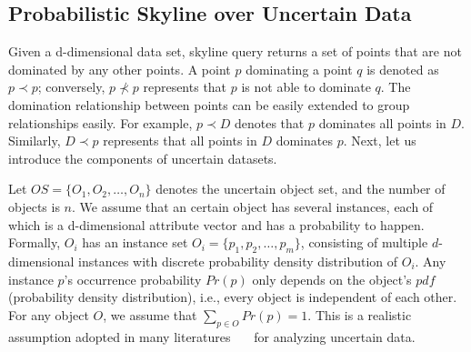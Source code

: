 \subsection{Probabilistic Skyline over Uncertain Data}
Given a d-dimensional data set, skyline query returns a set of points that are not dominated by any other points. A point \(p\) dominating a point \(q\) is denoted as \(p \prec p\); conversely, \(p \nprec p\) represents that \(p\) is not able to dominate \(q\). The domination relationship between points can be easily extended to group relationships easily. For example, \(p \prec D\) denotes that \(p\) dominates all points in \(D\). Similarly, \(D \prec p\) represents that all points in \(D\) dominates $p$. Next, let us introduce the components of uncertain datasets.

Let \(OS= \{O_{1},O_{2},\dots,O_{n}\}\) denotes the uncertain object set, and the number of objects is \(n\). We assume that an certain object has several instances, each of which is a d-dimensional attribute vector and has a probability to happen. Formally, \(O_{i}\) has an instance set \(O_{i} =\{p_{1},p_{2},\dots,p_{m}\}\), consisting of multiple \(d\)-dimensional instances with discrete probability density distribution of \(O_{i}\). Any instance \(p\)'s occurrence probability \(Pr(p)\) only depends on the object's \(pdf\)(probability density distribution), i.e., every object is independent of each other. For any object \(O\), we assume that \(\sum_{p\in O}Pr(p) = 1\). This is a realistic assumption adopted in many literatures~\cite{pei2007}~\cite{bohm2009}~\cite{kim2011} for analyzing uncertain data.

